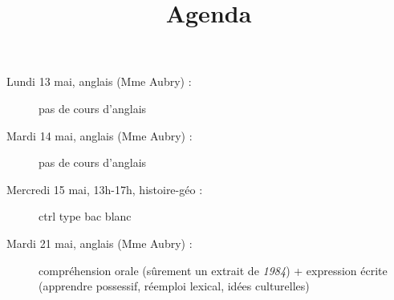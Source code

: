 \documentclass[12pt]{article}
\title{\textbf{Agenda}}
\date{}
\begin{document}
\maketitle

\begin{description}
\item[Lundi 13 mai, anglais (Mme Aubry) :] pas de cours d'anglais
\item[Mardi 14 mai, anglais (Mme Aubry) :] pas de cours d'anglais
\item[Mercredi 15 mai, 13h-17h, histoire-géo :] ctrl type bac blanc
\item[Mardi 21 mai, anglais (Mme Aubry) :] compréhension orale (sûrement un extrait de \textit{1984}) + expression écrite (apprendre possessif, réemploi lexical, idées culturelles)
\end{description}
\end{document}
